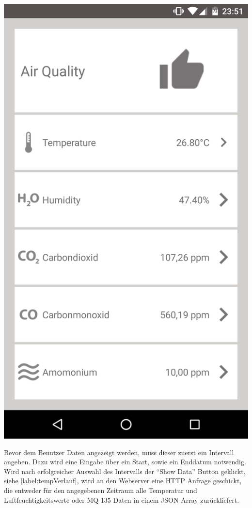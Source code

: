 \begin{minipage}[c]{0.5\textwidth}
	\centering
	\includegraphics[scale=0.1]{images/airQuality}
	\label{label:airquality}
\end{minipage}

Bevor dem Benutzer Daten angezeigt werden, muss dieser zuerst ein Intervall angeben. Dazu wird eine Eingabe über ein Start, sowie ein Enddatum notwendig. Wird nach erfolgreicher Auswahl des Intervalls der \enquote{Show Data} Button geklickt, siehe \autoref{label:tempVerlauf}, wird an den Webserver eine \ac{HTTP} Anfrage geschickt, die entweder für den angegebenen Zeitraum alle Temperatur und Luftfeuchtigkeitswerte oder MQ-135 Daten in einem \ac{JSON}-Array zurückliefert. 

